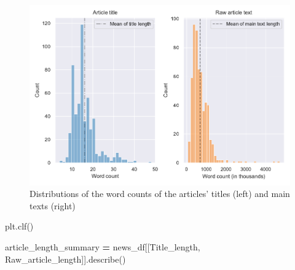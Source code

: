 \documentclass[a4paper, oneside]{report}
\newenvironment{Shaded}{\begin{snugshade}}{\end{snugshade}}
\newcommand{\AttributeTok}[1]{\textcolor[rgb]{0.77,0.63,0.00}{#1}}
\newcommand{\FunctionTok}[1]{\textcolor[rgb]{0.00,0.00,0.00}{#1}}
\newcommand{\NormalTok}[1]{#1}
\newcommand{\OperatorTok}[1]{\textcolor[rgb]{0.81,0.36,0.00}{\textbf{#1}}}
\newcommand{\SpecialCharTok}[1]{\textcolor[rgb]{0.00,0.00,0.00}{#1}}
\newcommand{\StringTok}[1]{\textcolor[rgb]{0.31,0.60,0.02}{#1}}
\renewenvironment{Shaded}
{
  \vspace{4pt}%
  \begin{snugshade}%
}{%
  \end{snugshade}%
  \vspace{4pt}%
}
\begin{document}
\begin{figure}
\centering
\includegraphics{versions/Chin_Chapter_4_2022-01-10_files/figure-latex/unnamed-chunk-6-3.pdf}
\caption{Distributions of the word counts of the articles' titles (left)
and main texts (right)}
\end{figure}

\begin{Shaded}
\begin{Highlighting}[]
\NormalTok{plt.clf()}
\end{Highlighting}
\end{Shaded}

\begin{Shaded}
\begin{Highlighting}[]
\NormalTok{article\_length\_summary }\OperatorTok{=}\NormalTok{ news\_df[[}\StringTok{\textquotesingle{}Title\_length\textquotesingle{}}\NormalTok{, }\StringTok{\textquotesingle{}Raw\_article\_length\textquotesingle{}}\NormalTok{]].describe()}
\end{Highlighting}
\end{Shaded}

\begin{Shaded}
\end{Shaded}
\end{document}
